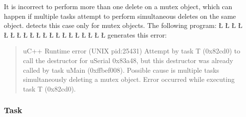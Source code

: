 \documentclass[openright,twoside]{report}
\begin{document}
It is incorrect to perform more than one delete on a mutex object, which can happen if multiple tasks attempt to perform simultaneous deletes on the same object.
\uC detects this case only for mutex objects.
The following program:
\LGinlinefalse\LGbegin\lgrinde
\L{}
\L{\LB{}}
\L{}
\L{\LB{}}
\L{\LB{}}
\CE{}\L{\LB{}}
\L{\LB{\};}}
\endlgrinde\LGend
\LGinlinefalse\LGbegin\lgrinde
\L{}
\L{\LB{}}
\L{\LB{}}
\L{\LB{}}
\CE{}\L{\LB{}}
\L{}
\L{\LB{}}
\L{\LB{\};}}
\endlgrinde\LGend
\LGinlinefalse\LGbegin\lgrinde
\L{}
\L{\LB{}}
\CE{}\L{\LB{}}
\CE{}\L{\LB{}}
\CE{}\L{\LB{\}}}
\endlgrinde\LGend
generates this error:
\begin{quote}
\BGfont
uC++ Runtime error (UNIX pid:25431) Attempt by task T (0x82cd0) to call the destructor for uSerial 0x83a48, but this destructor was already called by task uMain (0xffbef008).
Possible cause is multiple tasks simultaneously deleting a mutex object.
Error occurred while executing task T (0x82cd0).
\end{quote}


\subsubsection{Task}
\end{document}
